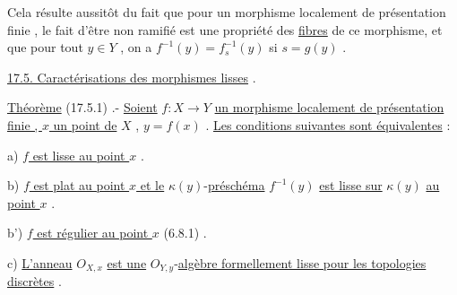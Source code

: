 Cela résulte aussitôt du fait que pour un morphisme localement de présentation finie , le fait d'être non ramifié est une propriété des \uline{fibres} de ce
morphisme, et  que pour tout $y\in Y$ , on a $f^{-1}(y)=f_s^{-1}(y)$ si $s=g(y)$ .\handwritten{]}

\uline{17.5. Caractérisations des morphismes lisses} .

\uline{Théorème} (17.5.1) .- \uline{Soient} $f:X\to Y$ \uline{un morphisme localement de présentation finie , $x$ un point de} $X$ , $y=f(x)$ . \uline{Les conditions suivantes sont équivalentes} :

a) \uline{$f$ est lisse au point $x$} .

b) \uline{$f$ est plat au point $x$ et le} $\kappa(y)$-\uline{préschéma} $f^{-1}(y)$ \uline{est lisse sur} $\kappa(y)$
\uline{au point $x$} .

b') \uline{$f$ est régulier au point $x$} (6.8.1) .

c) \uline{L'anneau} $O_{X,x}$ \uline{est une} $O_{Y,y}$-\uline{algèbre formellement lisse pour les topologies discrètes} .

